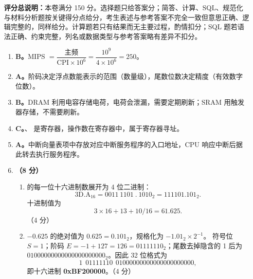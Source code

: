 \documentclass[a4paper,11pt]{article}
\begin{document}

\noindent\textbf{评分总说明：}本卷满分 150 分。选择题只给答案分；简答、计算、SQL、规范化与材料分析题按关键得分点给分，考生表述与参考答案不完全一致但意思正确、逻辑完整的，同样给分。计算题若只有结果而无主要过程，酌情扣分；SQL 题若语法正确、约束完整，列名或数据类型与参考答案略有差异不扣分。


\begin{enumerate}[start=1, label=\textbf{\arabic*.}, leftmargin=2.4em, itemsep=0.45em]

\item \textbf{B。}MIPS $=\dfrac{\text{主频}}{\text{CPI}\times10^{6}}=\dfrac{10^{9}}{4\times10^{6}}=250$。

\item \textbf{A。}阶码决定浮点数能表示的范围（数量级），尾数位数决定精度（有效数字位数）。

\item \textbf{B。}DRAM 利用电容存储电荷，电荷会泄漏，需要定期刷新；SRAM 用触发器存储，不需要刷新。

\item \textbf{C。}、 是寄存器，操作数在寄存器中，属于寄存器寻址。

\item \textbf{A。}中断向量表项中存放对应中断服务程序的入口地址，CPU 响应中断后据此转去执行服务程序。

\item \textbf{（8 分）}
\begin{enumerate}[label=（\arabic*）, leftmargin=2.2em, itemsep=1pt]
  \item {} 的每一位十六进制数展开为 4 位二进制：
  \[
  \text{3D.A}_{16}=0011\ 1101\ .\ 1010_2=111101.101_2.
  \]
  十进制值为
  \[
  3\times16+13+10/16=61.625.
  \]
  \hfill（4 分）

  \item $-0.625$ 的绝对值为 $0.625=0.101_2$，规格化为 $-1.01_2\times2^{-1}$。
  符号位 $S=1$；阶码 $E=-1+127=126=01111110_2$；尾数去掉隐含的 1 后为
  $01000000000000000000000_2$。因此 32 位格式为
  \[
  1\ \ 01111110\ \ 01000000000000000000000,
  \]
  即十六进制 \textbf{0xBF200000}。\hfill（4 分）
\end{enumerate}


\end{enumerate}
\end{document}
